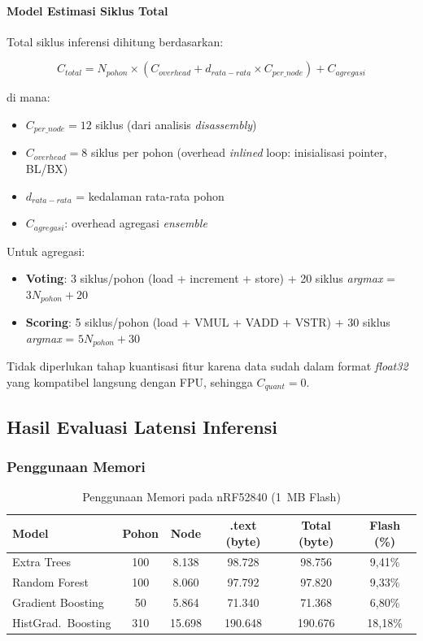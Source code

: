 \paragraph{Model Estimasi Siklus Total}

Total siklus inferensi dihitung berdasarkan:

\begin{equation}
    C_{total} = N_{pohon} \times (C_{overhead} + d_{rata-rata} \times C_{per\_node}) + C_{agregasi}
\end{equation}

di mana:
\begin{itemize}
    \item $C_{per\_node} = 12$ siklus (dari analisis \textit{disassembly})
    \item $C_{overhead} = 8$ siklus per pohon (overhead \textit{inlined} loop: inisialisasi pointer, BL/BX)
    \item $d_{rata-rata}$ = kedalaman rata-rata pohon
    \item $C_{agregasi}$: overhead agregasi \textit{ensemble}
\end{itemize}

Untuk agregasi:
\begin{itemize}
    \item \textbf{Voting}: 3 siklus/pohon (load + increment + store) + 20 siklus \textit{argmax} = $3N_{pohon} + 20$
    \item \textbf{Scoring}: 5 siklus/pohon (load + VMUL + VADD + VSTR) + 30 siklus \textit{argmax} = $5N_{pohon} + 30$
\end{itemize}

Tidak diperlukan tahap kuantisasi fitur karena data sudah dalam format \textit{float32} yang kompatibel langsung dengan FPU, sehingga $C_{quant} = 0$.

\subsection{Hasil Evaluasi Latensi Inferensi}

\subsubsection{Penggunaan Memori}

\begin{table}[htbp]
\centering
\caption{Penggunaan Memori pada nRF52840 (1~MB Flash)}
\label{tab:arm_memory}
\begin{tabular}{lccccc}
\hline
\textbf{Model} & \textbf{Pohon} & \textbf{Node} & \textbf{.text (byte)} & \textbf{Total (byte)} & \textbf{Flash (\%)} \\
\hline
Extra Trees & 100 & 8.138  & 98.728   & 98.756   & 9,41\% \\
Random Forest & 100 & 8.060 & 97.792   & 97.820   & 9,33\% \\
Gradient Boosting & 50 & 5.864 & 71.340  & 71.368   & 6,80\% \\
HistGrad.\ Boosting & 310 & 15.698 & 190.648 & 190.676  & 18,18\% \\
\hline
\end{tabular}
\end{table}

